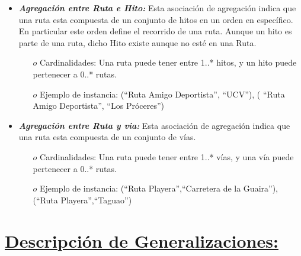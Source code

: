 \documentclass[a4paper]{article}
\begin{document}
\begin{itemize}



  
\item{	

\textbf{\textit{Agregación entre Ruta e Hito: }}Esta asociación de agregación indica que una ruta esta compuesta de un conjunto de hitos en un orden en específico. En particular este orden define el recorrido de una ruta. Aunque un hito es parte de una ruta, dicho Hito existe aunque no esté en una Ruta.
        
 \begin{itemize}
 
 \item[$o$]Cardinalidades: Una ruta puede tener entre 1..* hitos, y un hito puede pertenecer a 0..* rutas.
\item[$o$] Ejemplo de instancia: {(“Ruta Amigo Deportista”, “UCV”), ( “Ruta Amigo Deportista”, “Los
Próceres”)}
 
 \end{itemize}
 
 
 
}





  
\item{	

\textbf{\textit{Agregación entre Ruta y via: }}Esta asociación de agregación indica que una ruta esta compuesta de un conjunto de vías.
        
 \begin{itemize}
 
 \item[$o$]Cardinalidades: Una ruta puede tener entre 1..* vías, y una vía puede pertenecer a 0..* rutas.
 \item[$o$] Ejemplo de instancia: {(“Ruta Playera”,“Carretera de la Guaira”), (“Ruta Playera”,“Taguao”)}
 
 
 \end{itemize}
 
 }

\end{itemize}

\section{\underline{Descripción de Generalizaciones:} }
\end{document}
